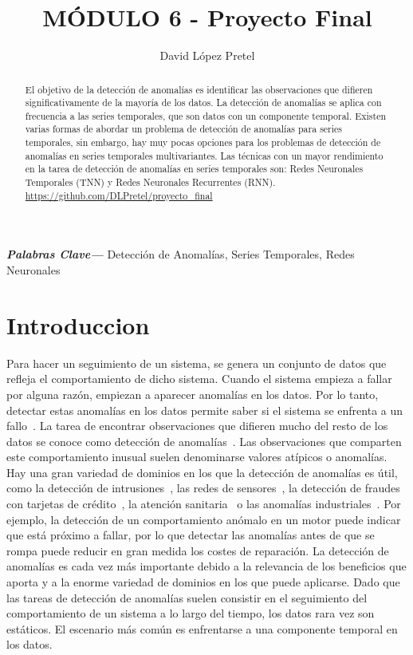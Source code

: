 \documentclass{article}
\providecommand{\keywords}[1]{\textbf{\textit{Palabras Clave---}} #1}
\begin{document}
	\title{MÓDULO 6 - Proyecto Final}
	\author{David López Pretel}
	\maketitle
	\newpage
	\tableofcontents
	\listoffigures
	\listoftables
	\newpage
	
	\begin{abstract}
		El objetivo de la detección de anomalías es identificar las observaciones que difieren significativamente de la mayoría de los datos.
		La detección de anomalías se aplica con frecuencia a las series temporales, que son datos con un componente temporal. Existen varias formas de abordar un problema de detección de anomalías para series temporales, sin embargo, hay muy pocas opciones para los problemas de detección de anomalías en series temporales multivariantes. Las técnicas con un mayor rendimiento en la tarea de detección de anomalías en series temporales son: Redes Neuronales Temporales (TNN) y Redes Neuronales Recurrentes (RNN).\\				\url{https://github.com/DLPretel/proyecto_final}
	\end{abstract}

	\keywords{Detección de Anomalías, Series Temporales, Redes Neuronales}
	
	\section{Introduccion}
	
	Para hacer un seguimiento de un sistema, se genera un conjunto de datos que refleja el comportamiento de dicho sistema. Cuando el sistema empieza a fallar por alguna razón, empiezan a aparecer anomalías en los datos. Por lo tanto, detectar estas anomalías en los datos permite saber si el sistema se enfrenta a un fallo~\cite{chandola2009anomaly, charuOutlier, erhan202164}. La tarea de encontrar observaciones que difieren mucho del resto de los datos se conoce como detección de anomalías~\cite{chandola2009anomaly}. Las observaciones que comparten este comportamiento inusual suelen denominarse valores atípicos o anomalías. 
	Hay una gran variedad de dominios en los que la detección de anomalías es útil, como la detección de intrusiones~\cite{kilincer2021machine}, las redes de sensores~\cite{kraljevski2021machine}, la detección de fraudes con tarjetas de crédito~\cite{forough2021ensemble}, la atención sanitaria~\cite{dwivedi2021novel} o las anomalías industriales~\cite{bayram2021real}.
	Por ejemplo, la detección de un comportamiento anómalo en un motor puede indicar que está próximo a fallar, por lo que detectar las anomalías antes de que se rompa puede reducir en gran medida los costes de reparación. La detección de anomalías es cada vez más importante debido a la relevancia de los beneficios que aporta y a la enorme variedad de dominios en los que puede aplicarse. Dado que las tareas de detección de anomalías suelen consistir en el seguimiento del comportamiento de un sistema a lo largo del tiempo, los datos rara vez son estáticos. El escenario más común es enfrentarse a una componente temporal en los datos.
	
\end{document}

